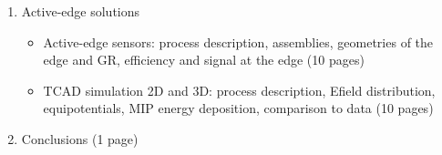 \begin{enumerate}
\item Active-edge solutions 
  \begin{itemize}
  \item Active-edge sensors: process description, assemblies,
    geometries of the edge and GR, efficiency and signal at the edge
    (10 pages)
  \item TCAD simulation 2D and 3D: process description, Efield distribution,
    equipotentials, MIP energy deposition, comparison to data (10 pages)
  \end{itemize}
\item Conclusions (1 page)
  
\end{enumerate}

